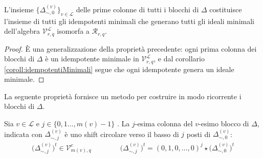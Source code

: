 \begin{prop}
  L'insieme $\lbrace \Delta_{\sim, 0}^{(v)} \rbrace_{v\in \mathscr{L}}$ delle prime colonne di tutti i blocchi di $\Delta$ costituisce l'insieme di tutti gli idempotenti minimali che generano tutti gli ideali minimali dell'algebra
  $\mathcal{V}_{r, q}^{\mathscr{L}}$ isomorfa a  $\mathcal{R}_{r,q} $.
\end{prop}
\begin{proof}
    È una generalizzazione della proprietà precedente: ogni prima colonna dei blocchi di $\Delta$ è un idempotente minimale in $\mathcal{V}_{r, q}^{\mathscr{L}}$, e dal corollario \ref{coroll:idempotentiMinimali} segue che ogni idempotente genera un ideale minimale.
\end{proof}

La seguente proprietà fornisce un metodo per costruire in modo ricorrente i blocchi di $\Delta$.
\begin{prop}
   Sia $v \in \mathscr{L}$ e $j \in \lbrace 0, 1 \dots , m(v)-1 \rbrace$ . La $j$-esima colonna del $v$-esimo blocco di $\Delta$, indicata con $\Delta_{\sim, j}^{(v)}$ è uno shift circolare verso il basso di $j$ posti di $\Delta_{\sim, 0}^{(v)}$:
   \begin{align*}
      \big( \Delta_{\sim, j}^{(v)} \big)^{t} \in \mathcal{V}_{m(v), q}^{c}
      \qquad \qquad
      \big( \Delta_{\sim, j}^{(v)} \big)^{t}  =  (0,1,0,\dots,0)^{j} \star \big( \Delta_{\sim, 0}^{(v)} \big)^{t}
   \end{align*}
\end{prop}
